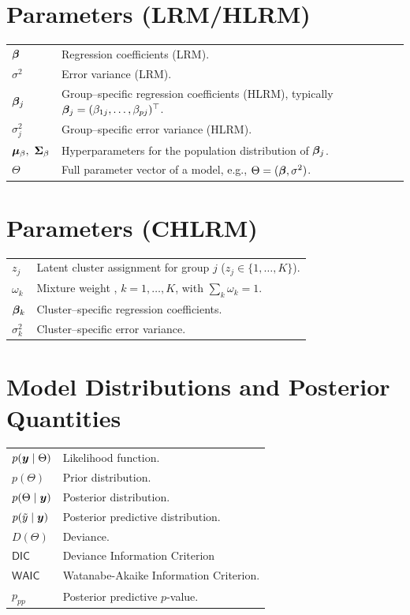 \section*{Parameters (LRM/HLRM)}
\begin{tabularx}{\textwidth}{>{\raggedright\arraybackslash}p{2.6cm} X}
$\bm{\beta}$ & Regression coefficients (LRM). \\
$\sigma^2$ & Error variance (LRM). \\
$\bm{\beta}_j$ & Group–specific regression coefficients (HLRM), typically $\bm{\beta}_j=(\beta_{1j},\ldots,\beta_{pj})^\top$. \\
$\sigma_j^2$ & Group–specific error variance (HLRM). \\
$\bm{\mu}_\beta,\ \mathbf{\Sigma}_\beta$ & Hyperparameters for the population distribution of $\bm{\beta}_j$. \\
$\Theta$ & Full parameter vector of a model, e.g., $\Theta=(\bm{\beta},\sigma^2)$.\\
\end{tabularx}

\vspace{0.5em}
\section*{Parameters (CHLRM)}
\begin{tabularx}{\textwidth}{>{\raggedright\arraybackslash}p{2.6cm} X}
$z_j$ & Latent cluster assignment for group $j$ ($z_j\in\{1,\ldots,K\}$). \\
$\omega_k$ & Mixture weight , $k=1,\ldots,K$, with $\sum_k \omega_k=1$. \\
$\bm{\beta}_k$ & Cluster–specific regression coefficients. \\
$\sigma_k^2$ & Cluster–specific error variance. \\
\end{tabularx}

\vspace{0.5em}
\section*{Model Distributions and Posterior Quantities}
\begin{tabularx}{\textwidth}{>{\raggedright\arraybackslash}p{2.6cm} X}
$p(\bm{y}\mid\Theta)$ & Likelihood function. \\
$p(\Theta)$ & Prior distribution. \\
$p(\Theta\mid\bm{y})$ & Posterior distribution. \\
$p(\tilde{y}\mid \bm{y})$ & Posterior predictive distribution. \\
$D(\Theta)$ & Deviance. \\
$\mathsf{DIC}$ & Deviance Information Criterion\\
$\mathsf{WAIC}$ & Watanabe-Akaike Information Criterion. \\
$p_{pp}$ & Posterior predictive $p$-value. \\
\end{tabularx}

